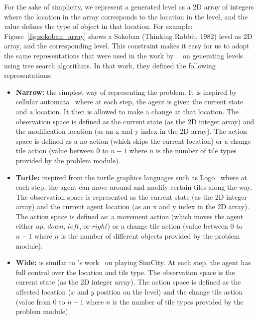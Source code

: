 \documentclass[letterpaper]{article} %
\begin{document}
For the sake of simplicity, we represent a generated level as a 2D array of integers where the location in the array corresponds to the location in the level, and the value defines the type of object in that location. For example: Figure~\ref{fig:sokoban_array} shows a Sokoban (Thinking Rabbit, 1982) level as 2D array, and the corresponding level. This constraint makes it easy for us to adopt the same representations that were used in the work by~\citeauthor{bhaumik2019tree}~ on generating levels using tree search algorithms. In that work, they defined the following representations:
\begin{itemize}
    \item \textbf{Narrow:} the simplest way of representing the problem. It is inspired by cellular automata~\cite{wolfram1983cellular} where at each step, the agent is given the current state and a location. It then is allowed to make a change at that location. The observation space is defined as the current state (as the 2D integer array) and the modification location (as an x and y index in the 2D array). The action space is defined as a no-action (which skips the current location) or a change tile action (value between $0$ to $n-1$ where $n$ is the number of tile types provided by the problem module). %
    \item \textbf{Turtle:} inspired from the turtle graphics languages such as Logo~\cite{bolt1967logo} where at each step, the agent can move around and modify certain tiles along the way. The observation space is represented as the current state (as the 2D integer array) and the current agent location (as an x and y index in the 2D array). The action space is defined as: a movement action (which moves the agent either $up$, $down$, $left$, or $right$) or a change tile action (value between $0$ to $n-1$ where $n$ is the number of different objects provided by the problem module).
    \item \textbf{Wide:} is similar to \citeauthor{earle2019using}'s work~ on playing SimCity. At each step, the agent has full control over the location and tile type. The observation space is the current state (as the 2D integer array). The action space is defined as the affected location ($x$ and $y$ position on the level) and the change tile action (value from $0$ to $n-1$ where $n$ is the number of tile types provided by the problem module).
\end{itemize}
\end{document}
